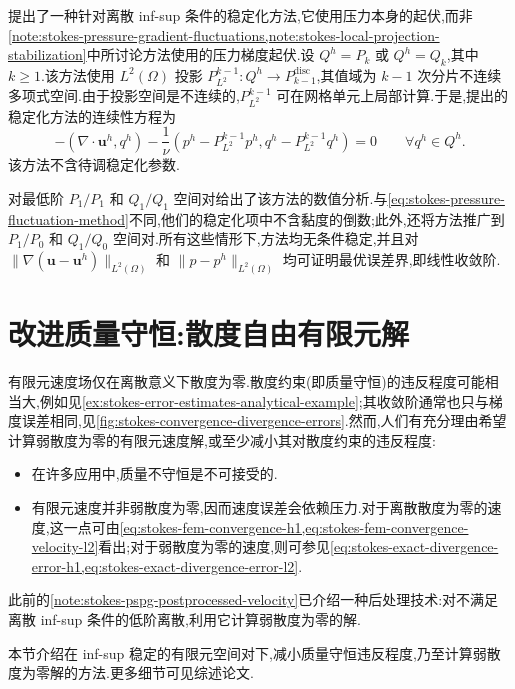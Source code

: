 \begin{note}[压力起伏稳定化]\label{note:stokes-pressure-fluctuation-stabilization}
\textcite{DohrmannBochev2004}提出了一种针对离散 inf-sup 条件的稳定化方法,它使用压力本身的起伏,而非\cref{note:stokes-pressure-gradient-fluctuations,note:stokes-local-projection-stabilization}中所讨论方法使用的压力梯度起伏.设 $Q^h=P_k$ 或 $Q^h=Q_k$,其中 $k\geq1$.该方法使用 $L^2(\Omega)$ 投影
$P_{L^2}^{k-1}:Q^h\to P_{k-1}^{\mathrm{disc}}$,其值域为 $k-1$ 次分片不连续多项式空间.由于投影空间是不连续的,$P_{L^2}^{k-1}$ 可在网格单元上局部计算.于是,\textcite{DohrmannBochev2004}提出的稳定化方法的连续性方程为
\begin{equation}\label{eq:stokes-pressure-fluctuation-method}
 -(\nabla\cdot\bm{u}^h,q^h)
 -\frac{1}{\nu}
   (p^h-P_{L^2}^{k-1}p^h,
    q^h-P_{L^2}^{k-1}q^h)=0
 \qquad\forall q^h\in Q^h.
\end{equation}
该方法不含待调稳定化参数.

\textcite{BochevDohrmannGunzburger2006}对最低阶 $P_1/P_1$ 和 $Q_1/Q_1$ 空间对给出了该方法的数值分析.与\cref{eq:stokes-pressure-fluctuation-method}不同,他们的稳定化项中不含黏度的倒数;此外,还将方法推广到 $P_1/P_0$ 和 $Q_1/Q_0$ 空间对.所有这些情形下,方法均无条件稳定,并且对 $\|\nabla(\bm{u}-\bm{u}^h)\|_{L^2(\Omega)}$ 和 $\|p-p^h\|_{L^2(\Omega)}$ 均可证明最优误差界,即线性收敛阶.
\end{note}

\section{改进质量守恒:散度自由有限元解}
\label{sec:stokes-improving-mass-conservation}

\begin{note}[动机]\label{note:stokes-mass-conservation-motivation}
有限元速度场仅在离散意义下散度为零.散度约束(即质量守恒)的违反程度可能相当大,例如见\cref{ex:stokes-error-estimates-analytical-example};其收敛阶通常也只与梯度误差相同,见\cref{fig:stokes-convergence-divergence-errors}.然而,人们有充分理由希望计算弱散度为零的有限元速度解,或至少减小其对散度约束的违反程度:
\begin{itemize}
  \item 在许多应用中,质量不守恒是不可接受的.
  \item 有限元速度并非弱散度为零,因而速度误差会依赖压力.对于离散散度为零的速度,这一点可由\cref{eq:stokes-fem-convergence-h1,eq:stokes-fem-convergence-velocity-l2}看出;对于弱散度为零的速度,则可参见\cref{eq:stokes-exact-divergence-error-h1,eq:stokes-exact-divergence-error-l2}.
\end{itemize}
此前的\cref{note:stokes-pspg-postprocessed-velocity}已介绍一种后处理技术:对不满足离散 inf-sup 条件的低阶离散,利用它计算弱散度为零的解.

本节介绍在 inf-sup 稳定的有限元空间对下,减小质量守恒违反程度,乃至计算弱散度为零解的方法.更多细节可见综述论文\textcite{JohnLinkeMerdonNeilanRebholz2016}.
\end{note}

